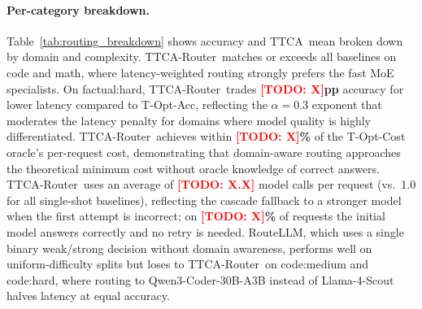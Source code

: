 \documentclass[11pt]{article}
\newcommand{\sysname}{TTCA-Router\xspace}
\newcommand{\ttca}{\textsc{TTCA}\xspace}
\newcommand{\result}[1]{\textbf{#1}}
\newcommand{\todo}[1]{\textcolor{red}{[TODO: #1]}}
\begin{document}
\paragraph{Per-category breakdown.}
Table~\ref{tab:routing_breakdown} shows accuracy and \ttca\ mean
broken down by domain and complexity.
\sysname\ matches or exceeds all baselines on code and math,
where latency-weighted routing strongly prefers the fast MoE specialists.
On factual:hard, \sysname\ trades \result{\todo{X}pp} accuracy
for lower latency compared to T-Opt-Acc,
reflecting the $\alpha=0.3$ exponent that moderates the latency penalty
for domains where model quality is highly differentiated.
\sysname\ achieves within \result{\todo{X}\%} of the T-Opt-Cost oracle's
per-request cost, demonstrating that domain-aware routing approaches
the theoretical minimum cost without oracle knowledge of correct answers.
\sysname\ uses an average of \result{\todo{X.X}} model calls per request
(vs.\ 1.0 for all single-shot baselines), reflecting the cascade fallback
to a stronger model when the first attempt is incorrect;
on \result{\todo{X}\%} of requests the initial model answers correctly
and no retry is needed.
RouteLLM, which uses a single binary weak/strong decision without domain
awareness, performs well on uniform-difficulty splits but loses to
\sysname\ on code:medium and code:hard, where routing
to Qwen3-Coder-30B-A3B instead of Llama-4-Scout halves latency
at equal accuracy.
\end{document}
